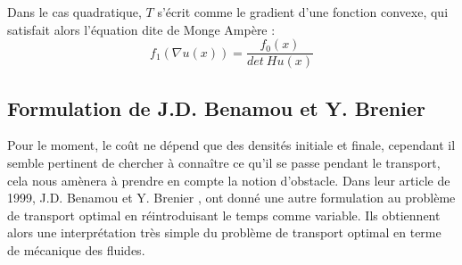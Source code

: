 \documentclass[a4paper,12pt]{article}
\begin{document}
Dans le cas quadratique, $T$ s'écrit comme le gradient d'une fonction convexe, qui satisfait alors l'équation dite de Monge Ampère : 
\begin{equation}
\tag{MA}
f_1(\nabla u(x)) = \frac{f_0(x)}{det\ H u(x)}
\label{eq:mongemapere}
\end{equation}






\subsection{Formulation de J.D. Benamou et Y. Brenier}
Pour le moment, le coût ne dépend que des densités initiale et finale, cependant il semble pertinent de chercher à connaître ce qu'il se passe pendant le transport, cela nous amènera à prendre en compte la notion d'obstacle. 
Dans leur article de 1999, J.D. Benamou et Y. Brenier \cite{benamoubrenier}, ont donné une autre formulation au problème de transport optimal en réintroduisant le temps comme variable. Ils obtiennent alors une interprétation très simple du problème de transport optimal en terme de mécanique des fluides. 
\end{document}
